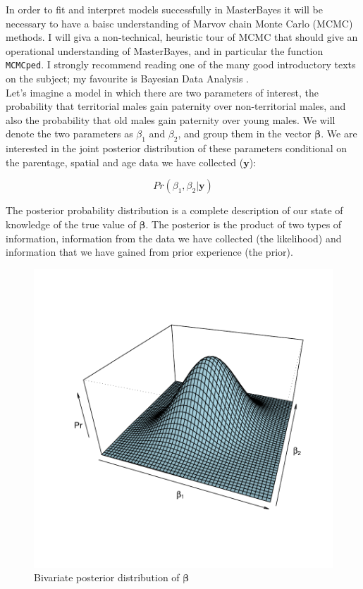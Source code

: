\documentclass{article}
\begin{document}
In order to fit and interpret models successfully in MasterBayes it will be necessary to have a baisc understanding of Marvov chain Monte Carlo (MCMC) methods.  I will giva a non-technical, heuristic tour of MCMC that should give an operational understanding of MasterBayes, and in particular the function \texttt{MCMCped}. I strongly recommend reading one of the many good introductory texts on the subject; my favourite is Bayesian Data Analysis \citep{Gelman.2004}.\\  

Let's imagine a model in which there are two parameters of interest, the probability that territorial males gain paternity over non-territorial males, and also the probability that old males gain paternity over young males.  We will denote the two parameters as $\beta_{1}$ and  $\beta_{2}$, and group them in the vector $\bm{\beta}$.   We are interested in the joint posterior distribution of these parameters conditional on the parentage, spatial and age data we have collected ($\bm{y}$):

\begin{equation}
Pr(\beta_{1}, \beta_{2} | \bm{y})
\end{equation}

The posterior probability distribution is a complete description of our state of knowledge of the true value of $\bm{\beta}$. The posterior is the product of two types of information, information from the data we have collected (the likelihood) and information that we have gained from prior experience (the prior).\\  



\begin{figure}[!h]
\begin{center}
\includegraphics{Tutorial-006}
\end{center}
\caption{Bivariate posterior distribution of $\bm{\beta}$}
\label{densityP}
\end{figure}
\end{document}
